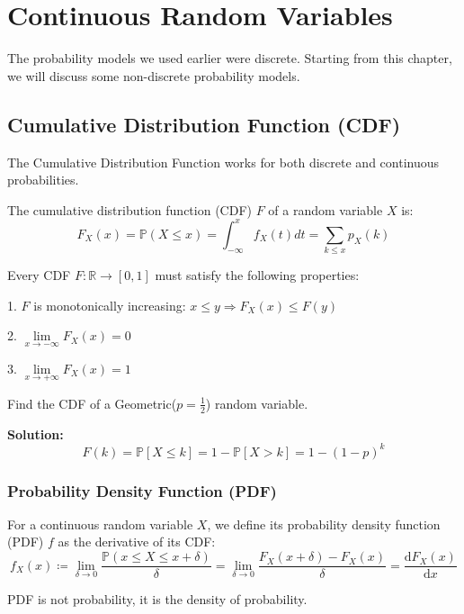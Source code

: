 \chapter{Continuous Random Variables}
The probability models we used earlier were discrete. Starting from this chapter, we will discuss some non-discrete probability models.

\section{Cumulative Distribution Function (CDF)}
The Cumulative Distribution Function works for both discrete and continuous probabilities.
\begin{definition}
  The cumulative distribution function (CDF) \(F\) of a random variable \(X\) is:
  \[
    F_X(x) = \mathbb{P}(X \leq x) = \int_{-\infty}^x f_X(t) dt = \sum_{k \leq x} p_X(k) 
  \]
\end{definition}

Every CDF \(F:\mathbb{R} \to [0, 1]\) must satisfy the following properties:

1. \(F\) is monotonically increasing: \(x \leq y \Longrightarrow F_X(x) \leq F(y)\)

2. \(\lim\limits_{x \to -\infty} F_X(x) = 0\) 

3. \(\lim\limits_{x \to +\infty} F_X(x) = 1\) 

\begin{eg}
    Find the CDF of a Geometric(\(p = \frac{1}{2}\)) random variable.

    \textbf{Solution:} 
    \[
        F(k) = \mathbb{P}[X \leq k] = 1 - \mathbb{P}[X > k] = 1 - (1 - p)^k
    \]
\end{eg}

\subsection{Probability Density Function (PDF)}
\begin{definition}
    For a continuous random variable \(X\), we define its probability density function (PDF) \(f\) as the derivative of its CDF:
    \[
        f_X(x) \coloneqq \lim_{\delta \to 0} \dfrac{\mathbb{P}(x \leq X \leq x + \delta)}{\delta}= \lim_{\delta \to 0} \dfrac{F_X(x + \delta) - F_X(x)}{\delta} = \frac{\mathrm{d}F_X(x)}{\mathrm{d}x}  
    \]

    \begin{remark}
        PDF is not probability, it is the density of probability. 
    \end{remark}
\end{definition}

